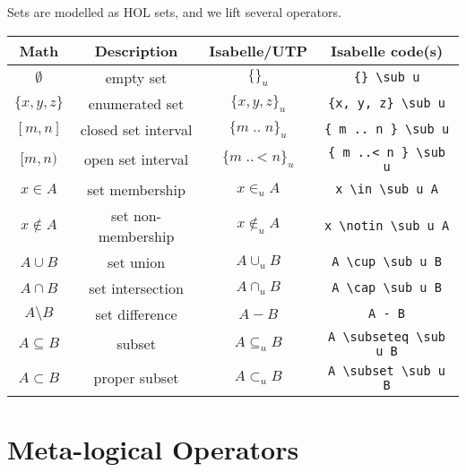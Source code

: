 \documentclass[11pt]{article}
\begin{document}
Sets are modelled as HOL sets, and we lift several operators.

\vspace{2ex}

\begin{center}
\begin{tabular}{|c|c|c|c|} \hline
  \textbf{Math}                  & \textbf{Description}        & \textbf{Isabelle/UTP}          & \textbf{Isabelle code(s)} \\ \hline
  $\emptyset$                    & empty set                   & $\{\}_u$                       & \verb|{} \sub u| \\
  $\{ x, y, z \}$                & enumerated set              & $\{ x, y, z \}_u$              & \verb|{x, y, z} \sub u| \\  
  $[m, n]$                       & closed set interval         & $\{ m \mathop{..} n \}_u$               & \verb|{ m .. n } \sub u| \\
  $[m, n)$                       & open set interval           & $\{ m \mathop{..\!\!<} n \}_u$              & \verb|{ m ..< n } \sub u| \\
  $x \in A$                      & set membership              & $x \in_u A$                    & \verb|x \in \sub u A| \\
  $x \notin A$                   & set non-membership          & $x \notin_u A$                 & \verb|x \notin \sub u A| \\
  $A \cup B$                     & set union                   & $A \cup_u B$                   & \verb|A \cup \sub u B| \\  
  $A \cap B$                     & set intersection            & $A \cap_u B$                   & \verb|A \cap \sub u B| \\  
  $A \setminus B$                & set difference              & $A - B$                        & \verb|A - B| \\
  $A \subseteq B$                & subset                      & $A \subseteq_u B$              & \verb|A \subseteq \sub u B| \\
  $A \subset B$                  & proper subset               & $A \subset_u B$                & \verb|A \subset \sub u B| \\
  \hline
\end{tabular}
\end{center}

\newpage

\section{Meta-logical Operators}
\end{document}
